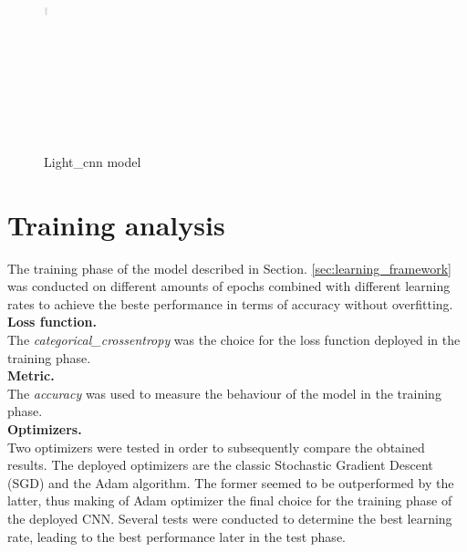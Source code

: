 \begin{figure}[h]
	\centering
	\includegraphics[width=5, height=8cm, width=0.25\textwidth]{CNN_schema}
	\caption{Light\_cnn model}
	\label{fig:CNN_schema}
\end{figure} 

\section{Training analysis}
\noindent The training phase of the model described in Section. \ref{sec:learning_framework} was conducted on different amounts of epochs combined with different learning rates to achieve the beste performance in terms of accuracy without overfitting.\\

\noindent \textbf{Loss function.}\\ The {\it{categorical\_crossentropy}} was the choice for the loss function deployed in the training phase.\\

\noindent \textbf{Metric.}\\ The {\it{accuracy}} was used to measure the behaviour of the model in the training phase.\\

\noindent \textbf{Optimizers.}\\ Two optimizers were tested in order to subsequently compare the obtained results. The deployed optimizers are the classic Stochastic Gradient Descent (SGD) and the Adam algorithm. The former seemed to be outperformed by the latter, thus making of Adam optimizer the final choice for the training phase of the deployed CNN. Several tests were conducted to determine the best learning rate, leading to the best performance later in the test phase. \\

